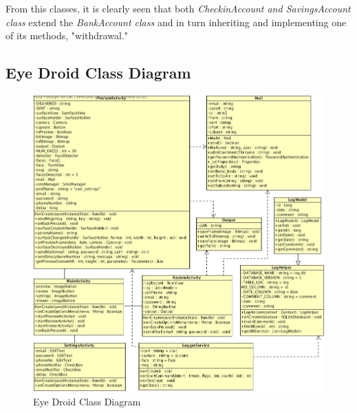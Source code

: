 From this classes, it is clearly seen that both {\it CheckinAccount and SavingsAccount class} extend the {\it BankAccount class} and in turn inheriting and implementing one of its methods, "withdrawal."
\newpage
\subsection{Eye Droid Class Diagram}  

\begin{figure}[ht!]
\centering
\includegraphics[width=170mm]{eye_droid_class_diagram1.jpg}
\caption{Eye Droid Class Diagram}
\label{overflow}
\end{figure}   
